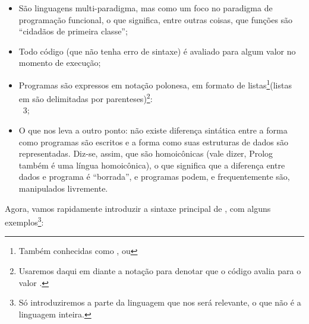 \begin{itemize}
\item São linguagens multi-paradigma, mas como um
  foco no paradigma de programação funcional, o que significa, entre
  outras coisas, que  funções são ``cidadãos de primeira classe'';
\item Todo código  (que não tenha erro de sintaxe) é avaliado para
  algum valor no momento de execução;
\item Programas são expressos em notação polonesa, em formato de
  listas\footnote{Também conhecidas como , ou
    }(listas em  são delimitadas por
  parenteses)\footnote{Usaremos daqui em diante a notação
     para denotar que o código
     avalia para o valor .}:
  \\
   \seta\ 3;
\item O que nos leva a outro ponto: não existe diferença
  sintática entre a forma como programas  são escritos
  e a forma como suas estruturas de dados são representadas. Diz-se,
  assim, que  são homoicônicas (vale dizer, Prolog
  também é uma língua homoicônica), o que significa que a diferença
  entre dados e programa é ``borrada'', e programas podem, e
  frequentemente são, manipulados livremente.
\end{itemize}

Agora, vamos rapidamente introduzir a sintaxe principal de
, com alguns exemplos\footnote{Só
  introduziremos a parte da linguagem que nos será relevante, o que
  não é a linguagem inteira.}:

